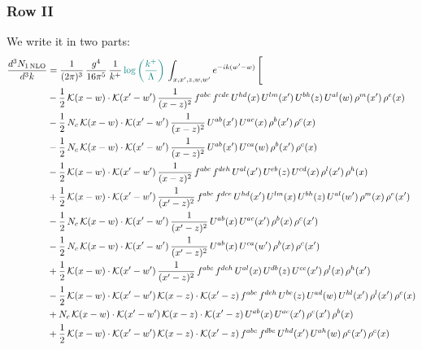 \documentclass[9pt]{article}
\numberwithin{equation}{section}
\begin{document}
\subsubsection{Row II}
We write it in two parts:
\begin{align}
\frac{d^{3}N_{1\,\mathrm{NLO}}}{d^{3}k} & = \frac{1}{(2\pi)^{3}}\,\frac{g^{4}}{16\pi^{5}}\,\frac{1}{k^{+}}\,{\color{teal}\log{\left(\frac{k^{+}}{\Lambda}\right)}}\,\int_{x,x',z,w,w'}e^{-ik(w'-w)}\,\Bigg[\notag\\ & -\frac{1}{2}\,\mathcal{K}(x-w)\cdot\mathcal{K}(x'-w')\,\frac{1}{(x-z)^{2}}\,f^{abc}\,f^{cde}\,U^{hd}(x)\,U^{lm}(x')\,U^{bh}(z)\,U^{al}(w)\,\rho^{m}(x')\,\rho^{e}(x)\notag\\
& -\frac{1}{2}\,N_{c}\,\mathcal{K}(x-w)\cdot\mathcal{K}(x'-w')\,\frac{1}{(x-z)^{2}}\,U^{ab}(x')\,U^{ac}(x)\,\rho^{b}(x')\,\rho^{c}(x)\notag\\
& -\frac{1}{2}\,N_{c}\,\mathcal{K}(x-w)\cdot\mathcal{K}(x'-w')\,\frac{1}{(x-z)^{2}}\,U^{ab}(x')\,U^{ca}(w)\,\rho^{b}(x')\,\rho^{c}(x)\notag\\
& -\frac{1}{2}\,\mathcal{K}(x-w)\cdot\mathcal{K}(x'-w')\,\frac{1}{(x-z)^{2}}\,f^{abc}\,f^{deh}\,U^{al}(x')\,U^{eb}(z)\,U^{cd}(x)\,\rho^{l}(x')\,\rho^{h}(x)\notag\\
& +\frac{1}{2}\,\mathcal{K}(x-w)\cdot\mathcal{K}(x'-w')\,\frac{1}{(x'-z)^{2}}\,f^{abc}\,f^{dce}\,U^{hd}(x')\,U^{lm}(x)\,U^{bh}(z)\,U^{al}(w')\,\rho^{m}(x)\,\rho^{e}(x')\notag\\
& -\frac{1}{2}\,N_{c}\,\mathcal{K}(x-w)\cdot\mathcal{K}(x'-w')\,\frac{1}{(x'-z)^{2}}\,U^{ab}(x)\,U^{ac}(x')\,\rho^{b}(x)\,\rho^{c}(x')\notag\\
& -\frac{1}{2}\,N_{c}\,\mathcal{K}(x-w)\cdot\mathcal{K}(x'-w')\,\frac{1}{(x'-z)^{2}}\,U^{ab}(x)\,U^{ca}(w')\,\rho^{b}(x)\,\rho^{c}(x')\notag\\
& +\frac{1}{2}\,\mathcal{K}(x-w)\cdot\mathcal{K}(x'-w')\,\frac{1}{(x'-z)^{2}}\,f^{abc}\,f^{deh}\,U^{al}(x)\,U^{db}(z)\,U^{ce}(x')\,\rho^{l}(x)\,\rho^{h}(x')\notag\\
& -\frac{1}{2}\,\mathcal{K}(x-w)\cdot\mathcal{K}(x'-w')\,\mathcal{K}(x-z)\cdot\mathcal{K}(x'-z)\,f^{abc}\,f^{deh}\,U^{be}(z)\,U^{ad}(w)\,U^{hl}(x')\,\rho^{l}(x')\,\rho^{c}(x)\notag\\
& +N_{c}\,\mathcal{K}(x-w)\cdot\mathcal{K}(x'-w')\,\mathcal{K}(x-z)\cdot\mathcal{K}(x'-z)\,U^{ab}(x)\,U^{ac}(x')\,\rho^{c}(x')\,\rho^{b}(x)\notag\\
& +\frac{1}{2}\,\mathcal{K}(x-w)\cdot\mathcal{K}(x'-w')\,\mathcal{K}(x-z)\cdot\mathcal{K}(x'-z)\,f^{abc}\,f^{dbe}\,U^{hd}(x')\,U^{ah}(w)\,\rho^{e}(x')\,\rho^{c}(x)\notag\\

\end{align}
\end{document}
